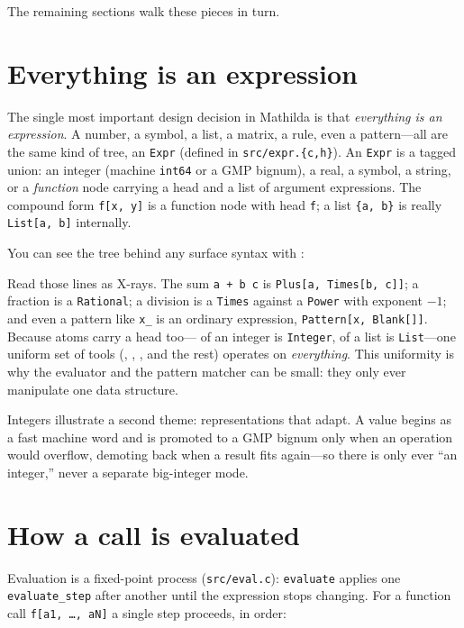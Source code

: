 The remaining sections walk these pieces in turn.

\section{Everything is an expression}
\label{app:expr}

The single most important design decision in Mathilda is that \emph{everything is an
expression}. A number, a symbol, a list, a matrix, a rule, even a pattern---all are
the same kind of tree, an \texttt{Expr} (defined in \texttt{src/expr.\{c,h\}}). An
\texttt{Expr} is a tagged union: an integer (machine \texttt{int64} or a GMP
bignum), a real, a symbol, a string, or a \emph{function} node carrying a head and a
list of argument expressions. The compound form \texttt{f[x, y]} is a function node
with head \texttt{f}; a list \texttt{\{a, b\}} is really \texttt{List[a, b]}
internally.

You can see the tree behind any surface syntax with :


Read those lines as X-rays. The sum \texttt{a + b c} is
\texttt{Plus[a, Times[b, c]]}; a fraction is a \texttt{Rational}; a division is a
\texttt{Times} against a \texttt{Power} with exponent $-1$; and even a pattern like
\texttt{x\_} is an ordinary expression, \texttt{Pattern[x, Blank[]]}. Because atoms
carry a head too--- of an integer is \texttt{Integer}, of a list is
\texttt{List}---one uniform set of tools (, , , and the
rest) operates on \emph{everything}. This uniformity is why the evaluator and the
pattern matcher can be small: they only ever manipulate one data structure.

Integers illustrate a second theme: representations that adapt. A value begins as a
fast machine word and is promoted to a GMP bignum only when an operation would
overflow, demoting back when a result fits again---so there is only ever ``an
integer,'' never a separate big-integer mode.

\section{How a call is evaluated}
\label{app:eval}

Evaluation is a fixed-point process (\texttt{src/eval.c}): \texttt{evaluate} applies
one \texttt{evaluate\_step} after another until the expression stops changing. For a
function call \texttt{f[a1, \dots, aN]} a single step proceeds, in order:

